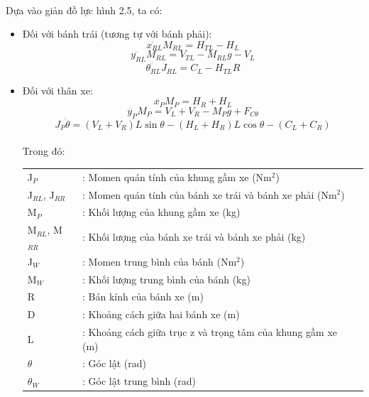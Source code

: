 \paragraph{}Dựa vào giản đồ lực hình 2.5, ta có:
\begin{itemize}
	\item Đối với bánh trái (tương tự với bánh phải): \\
\begin{equation}
	\ddot{x_{RL}}M_{RL} = H_{TL} - H_{L}
\end{equation}
\begin{equation}
\ddot{y_{RL}}M_{RL} = V_{TL} - M_{RL}g - V_{L}
\end{equation}
\begin{equation}
\ddot{\theta_{RL}}J_{RL} = C_{L} - H_{TL}R
\end{equation} 
\item Đối với thân xe: \\
\begin{equation}
\ddot{x_{P}}M_{P} = H_{R} + H_{L} 
\end{equation}
\begin{equation}
\ddot{y_{P}}M_{P} = V_{L} + V_{R} - M_{P}g + F_{C\theta}
\end{equation}
\begin{equation}
J_{P}\ddot{\theta} = (V_{L} + V_{R})L\sin{\theta} - (H_{L} + H_{R})L\cos{\theta} - (C_{L} + C_{R})
\end{equation}\\
Trong đó: \\

\begin{table}[H]
	\begin{center}
	\begin{tabular}{lll}
		J$_{P}$       & : Momen quán tính của khung gầm xe (Nm$^{2}$)                   \\
		J$_{RL}$, J$_{RR}$       & : Momen quán tính của bánh xe trái và bánh xe phải (Nm$^{2}$)                             \\
		M$_{P}$        & : Khối lượng của khung gầm xe (kg)                           \\
		M$_{RL}$, M$_{RR}$          & : Khối lượng của bánh xe trái và bánh xe phải (kg)                                \\
		J$_{W}$ & : Momen trung bình của bánh (Nm$^{2}$)  \\
		M$_{W}$ & : Khối lượng trung bình của bánh (kg)\\
		R          & : Bán kính của bánh xe (m)                              \\
		D          & : Khoảng cách giữa hai bánh xe (m)                         \\
		L          & : Khoảng cách giữa trục z và trọng tâm của khung gầm xe (m) \\
		$\theta$   & : Góc lật (rad)        \\
		$\theta_{W}$ & : Góc lật trung bình (rad)                                     
	\end{tabular}
\end{center}
\end{table}

\end{itemize}
